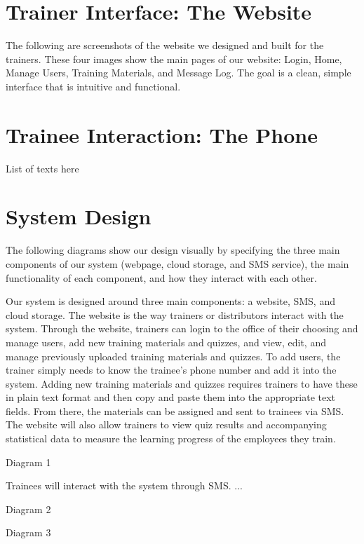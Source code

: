 \section{Trainer Interface: The Website}
The following are screenshots of the website we designed and built for the trainers. These four images show the main pages of our website: Login, Home, Manage Users, Training Materials, and Message Log. The goal is a clean, simple interface that is intuitive and functional.

\section{Trainee Interaction: The Phone}
List of texts here

\section{System Design}
The following diagrams show our design visually by specifying the three main components of our system (webpage, cloud storage, and SMS service), the main functionality of each component, and how they interact with each other.

Our system is designed around three main components: a website, SMS, and cloud storage. The website is the way trainers or distributors interact with the system. Through the website, trainers can login to the office of their choosing and manage users, add new training materials and quizzes, and view, edit, and manage previously uploaded training materials and quizzes. To add users, the trainer simply needs to know the trainee's phone number and add it into the system. Adding new training materials and quizzes requires trainers to have these in plain text format and then copy and paste them into the appropriate text fields. From there, the materials can be assigned and sent to trainees via SMS. The website will also allow trainers to view quiz results and accompanying statistical data to measure the learning progress of the employees they train. 

Diagram 1

Trainees will interact with the system through SMS. ...

Diagram 2

Diagram 3

